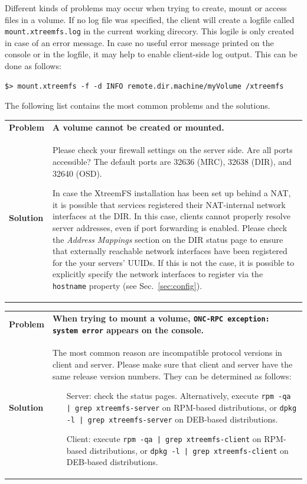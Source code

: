 \documentclass[a4paper,10pt]{book}
\begin{document}
Different kinds of problems may occur when trying to create, mount or access files in a volume. If no log file was specified, the client will create a logfile called \texttt{mount.xtreemfs.log} in the current working direcory. This logile is only created in case of an error message. In case no useful error message printed on the console or in the logfile, it may help to enable client-side log output. This can be done as follows:

\begin{verbatim}
$> mount.xtreemfs -f -d INFO remote.dir.machine/myVolume /xtreemfs
\end{verbatim}

The following list contains the most common problems and the solutions.

\begin{tabular}{lp{10cm}}
 \textbf{Problem}  & \textbf{A volume cannot be created or mounted.} \\
 \textbf{Solution} & Please check your firewall settings on the server side. Are all ports accessible? The default ports are 32636 (MRC), 32638 (DIR), and 32640 (OSD).

 In case the XtreemFS installation has been set up behind a NAT, it is possible that services registered their NAT-internal network interfaces at the DIR. In this case, clients cannot properly resolve server addresses, even if port forwarding is enabled. Please check the \emph{Address Mappings} section on the DIR status page to ensure that externally reachable network interfaces have been registered for the your servers' UUIDs. If this is not the case, it is possible to explicitly specify the network interfaces to register via the \texttt{hostname} property (see Sec.\ \ref{sec:config}).
\end{tabular}

\begin{tabular}{lp{10cm}}
 \textbf{Problem} & \textbf{When trying to mount a volume, \texttt{ONC-RPC exception: system error} appears on the console.}\\
 \textbf{Solution} & The most common reason are incompatible protocol versions in client and server. Please make sure that client and server have the same release version numbers. They can be determined as follows:
   \begin{itemize}
    \item[Server:] check the status pages. Alternatively, execute \texttt{rpm -qa | grep xtreemfs-server} on RPM-based distributions, or \texttt{dpkg -l | grep xtreemfs-server} on DEB-based distributions.
    \item[Client:] execute \texttt{rpm -qa | grep xtreemfs-client} on RPM-based distributions, or \texttt{dpkg -l | grep xtreemfs-client} on DEB-based distributions.
   \end{itemize}
\end{tabular}
\end{document}
